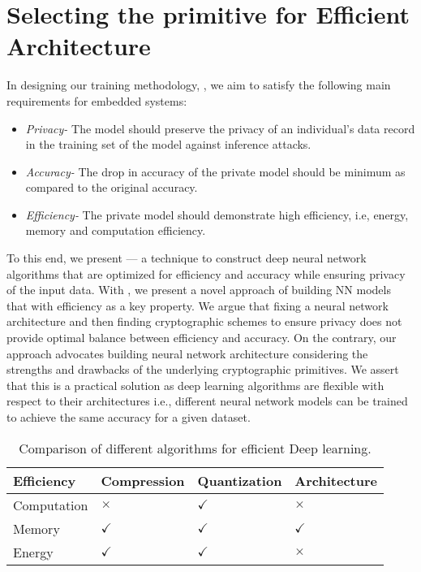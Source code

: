 \section{Selecting the primitive for Efficient Architecture}

In designing our training methodology, \method, we aim to satisfy the following main requirements for embedded systems:

\begin{itemize}
\item {\em Privacy-}
The model should preserve the privacy of an individual's data record in the training set of the model against inference attacks.

\item {\em Accuracy-}
The drop in accuracy of the private model should be minimum as compared to the original accuracy.

\item {\em Efficiency-}
The private model should demonstrate high efficiency, i.e, energy, memory and computation efficiency.
\end{itemize}

To this end, we present \method --- a technique to construct deep neural network algorithms that are optimized for efficiency and accuracy while ensuring privacy of the input data. With \method, we present a novel approach of building NN models that
with efficiency as a key property. We argue that fixing a neural network architecture and then finding cryptographic schemes to ensure privacy does not provide optimal balance between efficiency and accuracy. On the contrary, our approach advocates building neural network architecture considering the strengths and drawbacks of the underlying cryptographic primitives. We assert that this is a practical solution as deep learning algorithms are flexible with respect to their architectures i.e., different neural network models can be trained to achieve the same accuracy for a given dataset.


\begin{table}[!htb]
\begin{center}
\renewcommand\arraystretch{1.5}
\fontsize{6.7pt}{6.7pt}\selectfont
\begin{tabular}{|l|l|l|l|}
\hline
Efficiency & Compression & Quantization & Architecture \\
\hline
Computation & $\times$   & $\checkmark$   & $\times$ \\
\hline
Memory &  $\checkmark$ & $\checkmark$   & $\checkmark$ \\
\hline
Energy &  $\checkmark$   & $\checkmark$   & $\times$ \\
\hline
\end{tabular}
\end{center}
\caption{Comparison of different algorithms for efficient Deep learning.}
\label{tbl:comparison}
\end{table}


